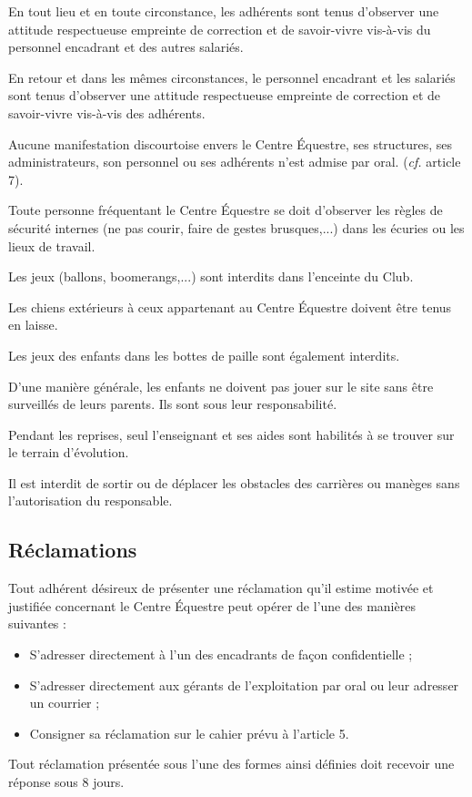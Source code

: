 \documentclass[11pt,a4paper]{article}
\begin{document}
En tout lieu et en toute circonstance, les adhérents sont tenus d'observer une attitude respectueuse empreinte de correction et de savoir-vivre vis-à-vis du personnel encadrant et des autres salariés.

En retour et dans les mêmes circonstances, le personnel encadrant et les salariés sont tenus d'observer une attitude respectueuse empreinte de correction et de savoir-vivre vis-à-vis des adhérents.

Aucune manifestation discourtoise envers le Centre Équestre, ses structures, ses administrateurs, son personnel ou ses adhérents n'est admise par oral. (\textit{cf.} article 7).

Toute personne fréquentant le Centre Équestre se doit d'observer les règles de sécurité internes (ne pas courir, faire de gestes brusques,...) dans les écuries ou les lieux de travail.

Les jeux (ballons, boomerangs,...) sont interdits dans l'enceinte du Club.\par
Les chiens extérieurs à ceux appartenant au Centre Équestre doivent être tenus en laisse.\par
Les jeux des enfants dans les bottes de paille sont également interdits.

D'une manière générale, les enfants ne doivent pas jouer sur le site sans être surveillés de leurs parents. Ils sont sous leur responsabilité.

Pendant les reprises, seul l'enseignant et ses aides sont habilités à se trouver sur le terrain d'évolution.

Il est interdit de sortir ou de déplacer les obstacles des carrières ou manèges sans l'autorisation du responsable.

\subsection{Réclamations}
Tout adhérent désireux de présenter une réclamation qu'il estime motivée et justifiée concernant le Centre Équestre peut opérer de l'une des manières suivantes :
\begin{itemize}[leftmargin=50pt]
\item
S'adresser directement à l'un des encadrants de façon confidentielle ;
\item
S'adresser directement aux gérants de l'exploitation par oral ou leur adresser un courrier ;
\item
Consigner sa réclamation sur le cahier prévu à l'article 5.
\end{itemize}
Tout réclamation présentée sous l'une des formes ainsi définies doit recevoir une réponse sous 8 jours.
\end{document}
